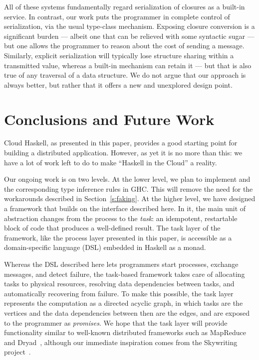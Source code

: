 \documentclass[preprint]{sigplanconf}
\begin{document}
All of these systems fundamentally regard serialization of closures
as a built-in service.  In contrast, our work puts the programmer in
complete control of serialization, via the usual type-class mechanism.
Exposing closure conversion is a significant burden --- albeit one that can be
relieved with some syntactic sugar --- but one allows the
programmer to reason about the cost of sending a message.
Similarly, explicit serialization will typically lose structure 
sharing within a transmitted value, whereas a built-in mechanism can retain it
--- but that is also true of any traversal of a data structure.
We do not argue that our approach is always better, but rather that it offers
a new and unexplored design point.

\section{Conclusions and Future Work}
\label{s:futureWork}
Cloud Haskell, as presented in this paper, provides a good starting point for building a distributed application.  
However, as yet it is no more than this: we have a lot of work left to do to make ``Haskell in the Cloud'' a reality.

Our ongoing work is on two levels.
At the lower level, we plan to implement  and the corresponding type inference rules in GHC.  This will remove the need for the workarounds described in Section~\ref{s:faking}.
At the higher level, we have designed a framework that builds on the interface described here.
In it, the main unit of abstraction changes from the process to the \emph{task}: an idempotent, restartable block of code that produces a well-defined result. The task layer of the framework, like the process layer presented in this paper, is accessible as a domain-specific language (DSL) embedded in Haskell as a monad.

Whereas the DSL described here lets programmers start processes, exchange messages, and detect failure, the task-based framework takes care of allocating tasks to physical resources, resolving data dependencies between tasks, and automatically recovering from failure. 
To make this possible, the task layer represents the computation as a directed acyclic graph, in which tasks are the vertices and the data dependencies between then are the edges, and are exposed to the programmer as \emph{promises}.
We hope that the task layer will provide functionality similar to well-known distributed frameworks such as MapReduce~\cite{MapReduce2008} and Dryad~\cite{Dryad2007}, although our immediate inspiration comes from the Skywriting project~\cite{Murray2010,Murray2011}.
\end{document}
